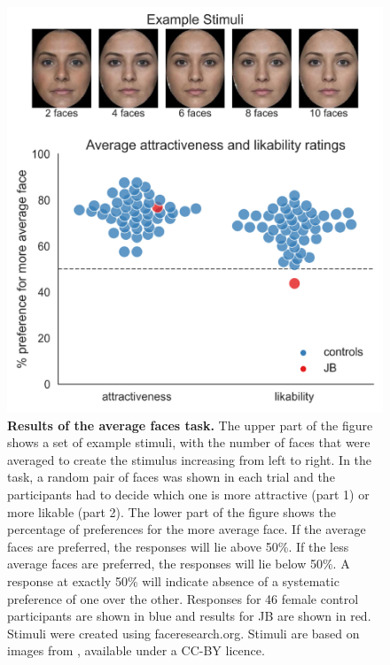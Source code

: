 \documentclass[fleqn,10pt]{SelfArx} %
\begin{document}
\begin{figure}[htbp]
	
	\renewcommand{\familydefault}{\sfdefault}\normalfont
	\centering
	\includegraphics[width=\columnwidth]{../reports/figures/attract_main_figure.png}
	\vspace*{-3mm}
 		\caption{\textbf{Results of the average faces task.} The upper part of the figure shows a set of example stimuli, with the number of faces that were averaged to create the stimulus increasing from left to right. In the task, a random pair of faces was shown in each trial and the participants had to decide which one is more attractive (part 1) or more likable (part 2). The lower part of the figure shows the percentage of preferences for the more average face. If the average faces are preferred, the responses will lie above 50\%. If the less average faces are preferred, the responses will lie below 50\%. A response at exactly 50\% will indicate absence of a systematic preference of one over the other. Responses for 46 female control participants are shown in blue and results for JB are shown in red. Stimuli were created using faceresearch.org. Stimuli are based on images from \citet{DeBruine2017}, available under a CC-BY licence.}%
 		\label{fig:attract}
\end{figure}
\end{document}
